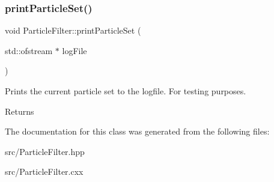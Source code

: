 \subsubsection{\texorpdfstring{print\+Particle\+Set()}{printParticleSet()}\hspace{0.1cm}{\footnotesize\ttfamily [2/2]}}
{\footnotesize\ttfamily void Particle\+Filter\+::print\+Particle\+Set (\begin{DoxyParamCaption}\item[{std\+::ofstream $\ast$}]{log\+File }\end{DoxyParamCaption})}



Prints the current particle set to the logfile. For testing purposes. 

\begin{DoxyReturn}{Returns}

\end{DoxyReturn}


The documentation for this class was generated from the following files\+:\begin{DoxyCompactItemize}
\item 
src/Particle\+Filter.\+hpp\item 
src/Particle\+Filter.\+cxx\end{DoxyCompactItemize}
